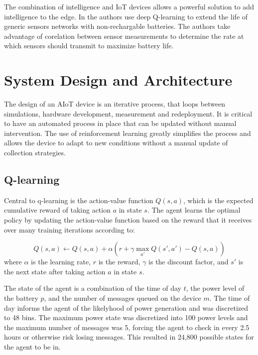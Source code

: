 \documentclass[10pt]{cai}
\begin{document}
The combination of intelligence and IoT devices allows a powerful solution to add intelligence to the edge.
In \cite{hribarUsingDeepQLearning2019} the authors use deep Q-learning to extend the life of generic sensors networks with non-rechargable batteries. 
The authors take advantage of corelation between sensor measurements to determine the rate at which sensors should transmit to maximize battery life.



\section{System Design and Architecture}

The design of an AIoT device is an iterative process, that loops between simulations, hardware development, measurement and redeployment.
It is critical to have an automated process in place that can be updated without manual intervention.
The use of reinforcement learning greatly simplifies the process and allows the device to adapt to new conditions without a manual update of collection strategies.

\subsection{Q-learning}

Central to q-learning is the action-value function $Q(s,a)$, which is the expected cumulative reward of taking action $a$ in state $s$.
The agent learns the optimal policy by updating the action-value function based on the reward that it receives over many training iterations according to:

\begin{equation}
  Q(s,a) \leftarrow Q(s,a) + \alpha \left( r + \gamma \max_{a'} Q(s',a') - Q(s,a) \right)
\end{equation}
where $\alpha$ is the learning rate, $r$ is the reward, $\gamma$ is the discount factor, and $s'$ is the next state after taking action $a$ in state $s$.

The state of the agent is a combination of the time of day $t$, the power level of the battery $p$, and the number of messages queued on the device $m$.
The time of day informs the agent of the likelyhood of power generation and was discretized to 48 bins.
The maximum power state was discretized into 100 power levels and the maximum number of messages was 5, forcing the agent to check in every 2.5 hours or otherwise risk losing messages.
This resulted in 24,800 possible states for the agent to be in.
\end{document}
